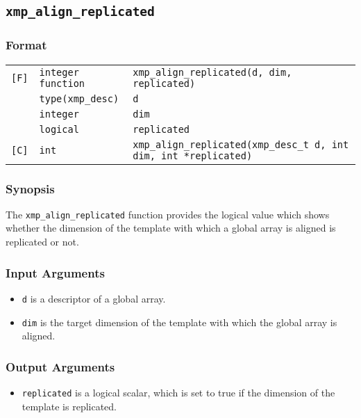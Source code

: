 \subsection{\tt xmp\_align\_replicated}

\subsubsection*{Format}

\begin{tabular}{lll}

\verb![F]!& {\tt integer function}& {\tt xmp\_align\_replicated(d, dim, replicated)}\\
          & {\tt type(xmp\_desc)} & {\tt d}\\
          & {\tt integer} & {\tt dim}\\
          & {\tt logical} & {\tt replicated}\\

\verb![C]!&  {\tt int}& {\tt xmp\_align\_replicated(xmp\_desc\_t d, int dim, int *replicated)}\\

\end{tabular}

\subsubsection*{Synopsis}

The {\tt xmp\_align\_replicated} function provides the logical value
which shows whether the dimension of the template with which a global
array is aligned is replicated or not. 


\subsubsection*{Input Arguments}
\begin{itemize}
 \item {\tt d} is a descriptor of a global array.
 \item {\tt dim} is the target dimension of the template with which the
       global array is aligned.
\end{itemize}

\subsubsection*{Output Arguments}
\begin{itemize}
 \item {\tt replicated} is a logical scalar, which is set to true if the
       dimension of the template is replicated.

\end{itemize}


